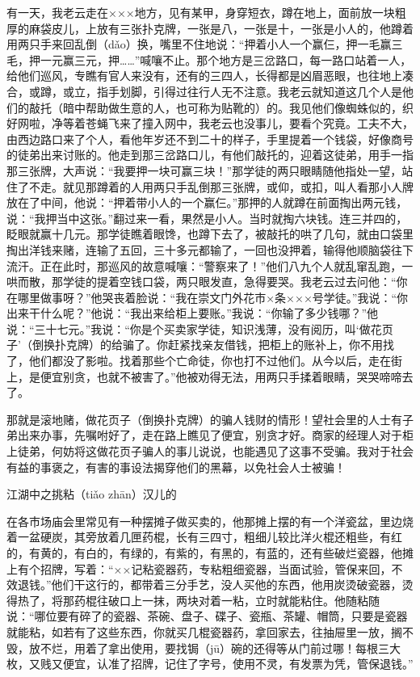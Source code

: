 \documentclass[12pt,UTF8]{ctexbook}
\begin{document}
有一天，我老云走在×××地方，见有某甲，身穿短衣，蹲在地上，面前放一块粗厚的麻袋皮儿，上放有三张扑克牌，一张是八，一张是十，一张是小人的，他蹲着用两只手来回乱倒（dǎo）换，嘴里不住地说：“押着小人一个赢仨，押一毛赢三毛，押一元赢三元，押……”喊嚷不止。那个地方是三岔路口，每一路口站着一人，给他们巡风，专瞧有官人来没有，还有的三四人，长得都是凶眉恶眼，也往地上凑合，或蹲，或立，指手划脚，引得过往行人无不注意。我老云就知道这几个人是他们的敲托（暗中帮助做生意的人，也可称为贴靴的）的。我见他们像蜘蛛似的，织好网啦，净等着苍蝇飞来了撞入网中，我老云也没事儿，要看个究竟。工夫不大，由西边路口来了个人，看他年岁还不到二十的样子，手里提着一个钱袋，好像商号的徒弟出来讨账的。他走到那三岔路口儿，有他们敲托的，迎着这徒弟，用手一指那三张牌，大声说：“我要押一块可赢三块！”那学徒的两只眼睛随他指处一望，站住了不走。就见那蹲着的人用两只手乱倒那三张牌，或仰，或扣，叫人看那小人牌放在了中间，他说：“押着带小人的一个赢仨。”那押的人就蹲在前面掏出两元钱，说：“我押当中这张。”翻过来一看，果然是小人。当时就掏六块钱。连三并四的，眨眼就赢十几元。那学徒瞧着眼馋，也蹲下去了，被敲托的哄了几句，就由口袋里掏出洋钱来赌，连输了五回，三十多元都输了，一回也没押着，输得他顺脑袋往下流汗。正在此时，那巡风的故意喊嚷：“警察来了！”他们八九个人就乱窜乱跑，一哄而散，那学徒的提着空钱口袋，两只眼发直，急得要哭。我老云过去问他：“你在哪里做事呀？”他哭丧着脸说：“我在崇文门外花市×条×××号学徒。”我说：“你出来干什么呢？”他说：“我出来给柜上要账。”我说：“你输了多少钱哪？”他说：“三十七元。”我说：“你是个买卖家学徒，知识浅薄，没有阅历，叫‘做花页子’（倒换扑克牌）的给骗了。你赶紧找亲友借钱，把柜上的账补上，你不用找了，他们都没了影啦。找着那些个亡命徒，你也打不过他们。从今以后，走在街上，是便宜别贪，也就不被害了。”他被劝得无法，用两只手揉着眼睛，哭哭啼啼去了。

那就是滚地赌，做花页子（倒换扑克牌）的骗人钱财的情形！望社会里的人士有子弟出来办事，先嘱咐好了，走在路上瞧见了便宜，别贪才好。商家的经理人对于柜上徒弟，何妨将这做花页子骗人的事儿说说，也能遇见了这事不受骗。我对于社会有益的事褒之，有害的事设法揭穿他们的黑幕，以免社会人士被骗！





江湖中之挑粘（tiǎo zhān）汉儿的


在各市场庙会里常见有一种摆摊子做买卖的，他那摊上摆的有一个洋瓷盆，里边烧着一盆硬炭，其旁放着几匣药棍，长有三四寸，粗细儿较比洋火棍还粗些，有红的，有黄的，有白的，有绿的，有紫的，有黑的，有蓝的，还有些破烂瓷器，他摊上有个招牌，写着：“××记粘瓷器药，专粘粗细瓷器，当面试验，管保来回，不效退钱。”他们干这行的，都带着三分手艺，没人买他的东西，他用炭烫破瓷器，烫得热了，将那药棍往破口上一抹，两块对着一粘，立时就能粘住。他随粘随说：“哪位要有碎了的瓷器、茶碗、盘子、碟子、瓷瓶、茶罐、帽筒，只要是瓷器就能粘，如若有了这些东西，你就买几棍瓷器药，拿回家去，往抽屉里一放，搁不毁，放不烂，用着了拿出使用，要找锔（jū）碗的还得等从门前过哪！每根三大枚，又贱又便宜，认准了招牌，记住了字号，使用不灵，有发票为凭，管保退钱。”
\end{document}
